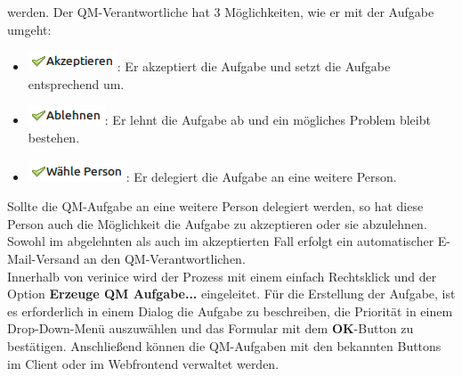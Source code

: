 \documentclass[a4paper,10pt]{book}
\begin{document}
werden. Der QM-Verantwortliche hat 3 Möglichkeiten, wie er mit der Aufgabe umgeht:
\begin{itemize}
\item \includegraphics[height=2ex]{Icon/Akzeptieren.png}: Er akzeptiert die Aufgabe und setzt die Aufgabe entsprechend um.
\item \includegraphics[height=2ex]{Icon/Ablehnen.png}: Er lehnt die Aufgabe ab und ein mögliches Problem bleibt bestehen.
\item \includegraphics[height=2ex]{Icon/waehle_person.png}: Er delegiert die Aufgabe an eine weitere Person.
\end{itemize}
Sollte die QM-Aufgabe an eine weitere Person delegiert werden, so hat diese Person auch die Möglichkeit die Aufgabe zu akzeptieren oder sie
abzulehnen. Sowohl im abgelehnten als auch im akzeptierten Fall erfolgt ein automatischer E-Mail-Versand an den QM-Verantwortlichen.
\newline\\
Innerhalb von verinice wird der Prozess mit einem einfach Rechtsklick und der Option \textbf{Erzeuge QM Aufgabe...} eingeleitet. Für die Erstellung der Aufgabe,
ist es erforderlich in einem Dialog die Aufgabe zu beschreiben, die Priorität in einem Drop-Down-Menü auszuwählen und das Formular mit dem \textbf{OK}-Button zu bestätigen.
Anschließend können die QM-Aufgaben mit den bekannten Buttons im Client oder im Webfrontend verwaltet werden.
\end{document}
